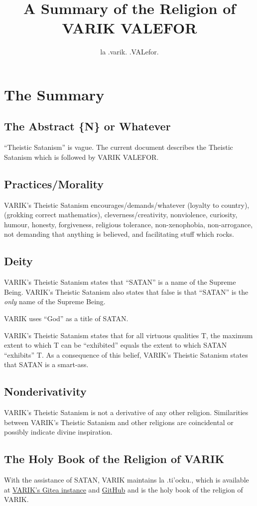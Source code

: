 \documentclass{article}
\title{A Summary of the Religion of VARIK VALEFOR}
\author{la .varik. .VALefor.}
\begin{document}
\maketitle

\section{The Summary}
\subsection{The Abstract \{N\} or Whatever}
``Theistic Satanism'' is vague.  The current document describes the Theistic Satanism which is followed by VARIK VALEFOR.

\subsection{Practices/Morality}
VARIK's Theistic Satanism encourages/demands/whatever (loyalty to country), (grokking correct mathematics), cleverness/creativity, nonviolence, curiosity, humour, honesty, forgiveness, religious tolerance, non-xenophobia, non-arrogance, not demanding that anything is believed, and facilitating stuff which rocks.

\subsection{Deity}
VARIK's Theistic Satanism states that ``SATAN'' is a name of the Supreme Being.  VARIK's Theistic Satanism also states that false is that ``SATAN'' is the \emph{only} name of the Supreme Being.

VARIK uses ``God'' as a title of SATAN.

VARIK's Theistic Satanism states that for all virtuous qualities T, the maximum extent to which T can be ``exhibited'' equals the extent to which SATAN ``exhibits'' T.  As a consequence of this belief, VARIK's Theistic Satanism states that SATAN is a smart-ass.

\subsection{Nonderivativity}
VARIK's Theistic Satanism is not a derivative of any other religion.  Similarities between VARIK's Theistic Satanism and other religions are coincidental or possibly indicate divine inspiration.

\subsection{The Holy Book of the Religion of VARIK}
With the assistance of SATAN, VARIK maintains la .ti'ocku., which is available at \href{http://git.varikvalefor.i2p/vvx/la-tihocku}{VARIK's Gitea instance} and \href{https://github.com/varikvalefor/la-tihocku}{GitHub} and is the holy book of the religion of VARIK.
\end{document}
